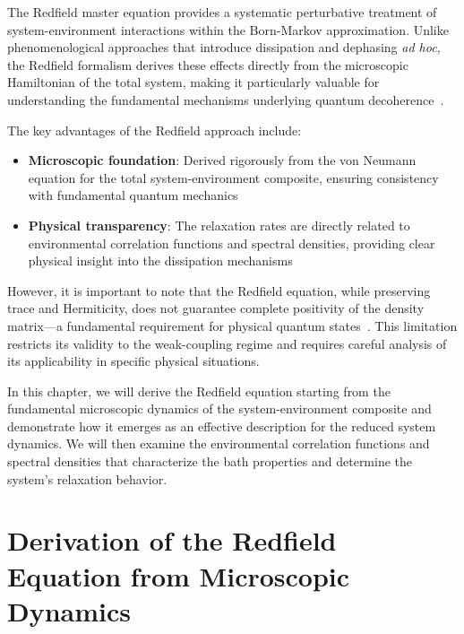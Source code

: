 The Redfield master equation provides a systematic perturbative treatment of system-environment interactions within the Born-Markov approximation. Unlike phenomenological approaches that introduce dissipation and dephasing \emph{ad hoc}, the Redfield formalism derives these effects directly from the microscopic Hamiltonian of the total system, making it particularly valuable for understanding the fundamental mechanisms underlying quantum decoherence~\cite{breuerpetruccione2009theoryopenquantum, weiss2012quantumdissipativesystems}.

The key advantages of the Redfield approach include:
\begin{itemize}
	\item \textbf{Microscopic foundation}: Derived rigorously from the von Neumann equation for the total system-environment composite, ensuring consistency with fundamental quantum mechanics~\cite{breuerpetruccione2009theoryopenquantum}
	\item \textbf{Physical transparency}: The relaxation rates are directly related to environmental correlation functions and spectral densities, providing clear physical insight into the dissipation mechanisms~\cite{redfield1965theoryrelaxationprocesses}
\end{itemize}

However, it is important to note that the Redfield equation, while preserving trace and Hermiticity, does not guarantee complete positivity of the density matrix—a fundamental requirement for physical quantum states~\cite{rivasetal2010markovianmasterequations}. This limitation restricts its validity to the weak-coupling regime and requires careful analysis of its applicability in specific physical situations.

In this chapter, we will derive the Redfield equation starting from the fundamental microscopic dynamics of the system-environment composite and demonstrate how it emerges as an effective description for the reduced system dynamics. We will then examine the environmental correlation functions and spectral densities that characterize the bath properties and determine the system's relaxation behavior.


\section{Derivation of the Redfield Equation from Microscopic Dynamics}
\label{sec:Derivation_redfield_eq_from_microscopic_dynamics}


